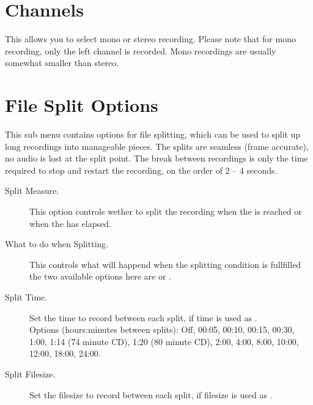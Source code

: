 \section{Channels}
  This allows you to select mono or stereo recording. Please note that
  for mono recording, only the left channel is recorded. Mono recordings
  are usually somewhat smaller than stereo.


      
\section{File Split Options}
  This sub menu contains options for file splitting, which can be used to split
  up long recordings into manageable pieces. The splits are seamless (frame
  accurate), no audio is lost at the split point. The break between recordings
  is only the time required to stop and restart the recording, on the order of
  2 -- 4 seconds.
  \begin{description}
    \item[Split Measure.]
      This option controls wether to split the recording when the
       is reached or when the
       has elapsed.

    \item[What to do when Splitting.]
      This controls what will happend when the splitting condition is
      fullfilled the two available options here are
       or .

    \item[Split Time.]
      Set the time to record between each split, if time is used as
      .\\
      Options (hours:minutes between splits): Off, 00:05, 00:10, 00:15, 00:30,
      1:00, 1:14 (74 minute CD), 1:20 (80 minute CD), 2:00, 4:00, 8:00, 10:00,
      12:00, 18:00, 24:00.

    \item[Split Filesize.]
      Set the filesize to record between each split, if filesize is used as
      .

  \end{description}

